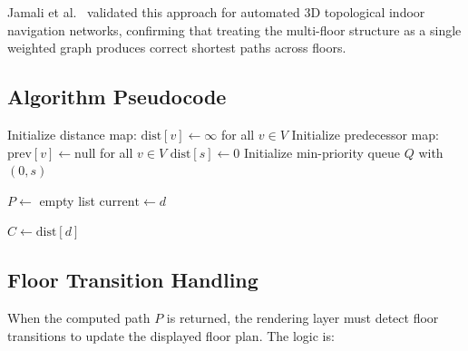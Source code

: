 Jamali et al.\ \cite{Jamali2017} validated this approach for automated 3D topological indoor navigation networks, confirming that treating the multi-floor structure as a single weighted graph produces correct shortest paths across floors.

\subsection{Algorithm Pseudocode}

\begin{algorithm}[H]
\caption{Dijkstra's Shortest Path for Multi-Floor Indoor Graph}
\label{alg:dijkstra}
\SetAlgoLined
{}

\BlankLine
Initialize distance map: $\text{dist}[v] \leftarrow \infty$ for all $v \in V$\;
Initialize predecessor map: $\text{prev}[v] \leftarrow \text{null}$ for all $v \in V$\;
$\text{dist}[s] \leftarrow 0$\;
Initialize min-priority queue $Q$ with $(0, s)$\;

\BlankLine
{}

\BlankLine
{}
$P \leftarrow$ empty list\;
$\text{current} \leftarrow d$\;

\BlankLine
$C \leftarrow \text{dist}[d]$\;
\;
\end{algorithm}

\subsection{Floor Transition Handling}

When the computed path $P$ is returned, the rendering layer must detect floor transitions to update the displayed floor plan. The logic is:

